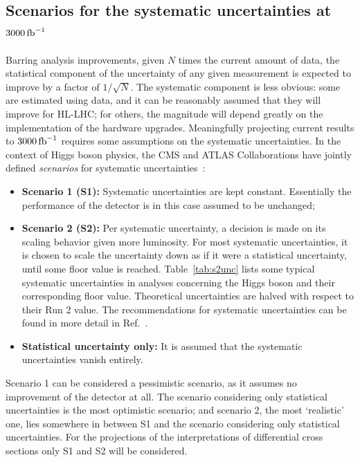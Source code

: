 \subsection{Scenarios for the systematic uncertainties at \texorpdfstring{$3000\,\text{fb}^{-1}$}{3000 fb-1}}

Barring analysis improvements, given $N$ times the current amount of data, the statistical component of the uncertainty of any given measurement is expected to improve by a factor of $1/\sqrt{N}$.
% 
The systematic component is less obvious: some are estimated using data, and it can be reasonably assumed that they will improve for HL-LHC; for others, the magnitude will depend greatly on the implementation of the hardware upgrades.
% 
Meaningfully projecting current results to $3000\,\text{fb}^{-1}$ requires some assumptions on the systematic uncertainties.
% 
In the context of Higgs boson physics, the CMS and ATLAS Collaborations have jointly defined \textit{scenarios} for systematic uncertainties~\cite{s1s2talk}:
% 
\begin{itemize}
\item \textbf{Scenario 1 (S1):} Systematic uncertainties are kept constant. Essentially the performance of the detector is in this case assumed to be unchanged;
% 
\item \textbf{Scenario 2 (S2):} Per systematic uncertainty, a decision is made on its scaling behavior given more luminosity.
% 
For most systematic uncertainties, it is chosen to scale the uncertainty down as if it were a statistical uncertainty, until some floor value is reached.
% 
Table~\ref{tab:s2unc} lists some typical systematic uncertainties in analyses concerning the Higgs boson and their corresponding floor value.
% 
Theoretical uncertainties are halved with respect to their Run 2 value.
% 
The recommendations for systematic uncertainties can be found in more detail in Ref.~\cite{CMS:2018qgz}.
% 
\item \textbf{Statistical uncertainty only:} It is assumed that the systematic uncertainties vanish entirely.
\end{itemize}
% 
Scenario 1 can be considered a pessimistic scenario, as it assumes no improvement of the detector at all.
% 
The scenario considering only statistical uncertainties is the most optimistic scenario; and scenario 2, the most `realistic' one, lies somewhere in between S1 and the scenario considering only statistical uncertainties.
% 
For the projections of the interpretations of differential cross sections only S1 and S2 will be considered.



